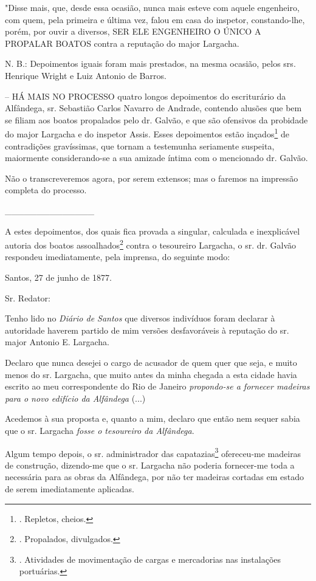 "Disse mais, que, desde essa ocasião, nunca mais esteve com aquele
engenheiro, com quem, pela primeira e última vez, falou em casa do
inspetor, constando-lhe, porém, por ouvir a diversos, SER ELE ENGENHEIRO
O ÚNICO A PROPALAR BOATOS contra a reputação do major Largacha.

N. B.: Depoimentos iguais foram mais prestados, na mesma ocasião, pelos
srs. Henrique Wright e Luiz Antonio de Barros.

-- HÁ MAIS NO PROCESSO quatro longos depoimentos do escriturário da
Alfândega, sr. Sebastião Carlos Navarro de Andrade, contendo alusões que
bem se filiam aos boatos propalados pelo dr. Galvão, e que são ofensivos
da probidade do major Largacha e do inspetor Assis. Esses depoimentos
estão inçados\footnote{. Repletos, cheios.} de contradições gravíssimas,
que tornam a testemunha seriamente suspeita, maiormente considerando-se
a sua amizade íntima com o mencionado dr. Galvão.

Não o transcreveremos agora, por serem extensos; mas o faremos na
impressão completa do processo.

\_\_\_\_\_\_\_\_\_\_\_\_\_\_

A estes depoimentos, dos quais fica provada a singular, calculada e
inexplicável autoria dos boatos assoalhados\footnote{. Propalados,
  divulgados.} contra o tesoureiro Largacha, o sr. dr. Galvão respondeu
imediatamente, pela imprensa, do seguinte modo:

Santos, 27 de junho de 1877.

Sr. Redator:

Tenho lido no \emph{Diário de Santos} que diversos indivíduos foram
declarar à autoridade haverem partido de mim versões desfavoráveis à
reputação do sr. major Antonio E. Largacha.

Declaro que nunca desejei o cargo de acusador de quem quer que seja, e
muito menos do sr. Largacha, que muito antes da minha chegada a esta
cidade havia escrito ao meu correspondente do Rio de Janeiro
\emph{propondo-se a fornecer madeiras para o novo edifício da Alfândega}
(...)

Acedemos à sua proposta e, quanto a mim, declaro que então nem sequer
sabia que o sr. Largacha \emph{fosse o tesoureiro da Alfândega}.

Algum tempo depois, o sr. administrador das capatazias\footnote{.
  Atividades de movimentação de cargas e mercadorias nas instalações
  portuárias.} ofereceu-me madeiras de construção, dizendo-me que o sr.
Largacha não poderia fornecer-me toda a necessária para as obras da
Alfândega, por não ter madeiras cortadas em estado de serem
imediatamente aplicadas.

